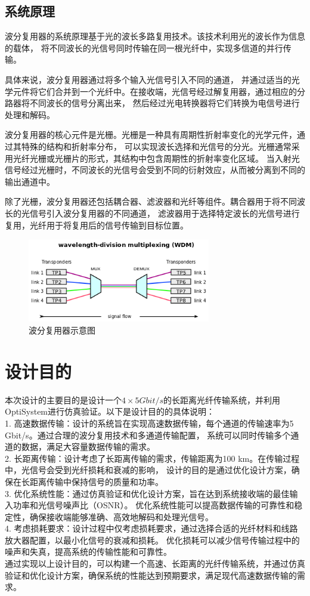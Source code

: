 \documentclass[12pt]{article}
\begin{document}
\subsection{系统原理}
波分复用器的系统原理基于光的波长多路复用技术。该技术利用光的波长作为信息的载体，
将不同波长的光信号同时传输在同一根光纤中，实现多信道的并行传输。

具体来说，波分复用器通过将多个输入光信号引入不同的通道，
并通过适当的光学元件将它们合并到一个光纤中。在接收端，光信号经过解复用器，通过相应的分路器将不同波长的信号分离出来，
然后经过光电转换器将它们转换为电信号进行处理和解码。

波分复用器的核心元件是光栅。光栅是一种具有周期性折射率变化的光学元件，通过其特殊的结构和折射率分布，
可以实现波长选择和光信号的分光。光栅通常采用光纤光栅或光栅片的形式，其结构中包含周期性的折射率变化区域。
当入射光信号经过光栅时，不同波长的光信号会受到不同的衍射效应，从而被分离到不同的输出通道中。

除了光栅，波分复用器还包括耦合器、滤波器和光纤等组件。耦合器用于将不同波长的光信号引入波分复用器的不同通道，
滤波器用于选择特定波长的光信号进行复用，光纤用于将复用后的信号传输到目标位置。
\begin{figure}[htbp]
	\centering
	\includegraphics[width=8cm]{figure1.png}
	\caption{波分复用器示意图}
\end{figure}
\clearpage
\section{设计目的}
本次设计的主要目的是设计一个$4\times 5 Gbit/s$的长距离光纤传输系统，并利用OptiSystem进行仿真验证。以下是设计目的的具体说明：\\
1.	高速数据传输：设计的系统旨在实现高速数据传输，每个通道的传输速率为5 Gbit/s。通过合理的波分复用技术和多通道传输配置，
系统可以同时传输多个通道的数据，满足大容量数据传输的需求。
\\
2.	长距离传输：设计考虑了长距离传输的需求，传输距离为100 km。在传输过程中，光信号会受到光纤损耗和衰减的影响，
设计的目的是通过优化设计方案，确保在长距离传输中保持信号的质量和功率。
\\
3.	优化系统性能：通过仿真验证和优化设计方案，旨在达到系统接收端的最佳输入功率和光信号噪声比（OSNR）。
优化系统性能可以提高数据传输的可靠性和稳定性，确保接收端能够准确、高效地解码和处理光信号。
\\
4.	考虑损耗要求：设计过程中仅考虑损耗要求，通过选择合适的光纤材料和线路放大器配置，以最小化信号的衰减和损耗。
优化损耗可以减少信号传输过程中的噪声和失真，提高系统的传输性能和可靠性。
\\
通过实现以上设计目的，可以构建一个高速、长距离的光纤传输系统，并通过仿真验证和优化设计方案，确保系统的性能达到预期要求，满足现代高速数据传输的需求。
\end{document}
